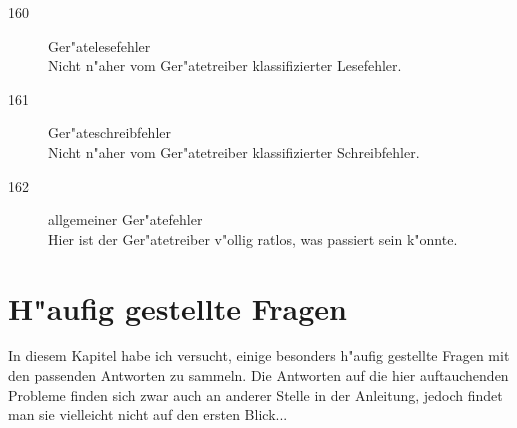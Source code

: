 \documentclass[12pt,a4paper,twoside]{report}
\begin{document}
{\begin{description}
\item[160]{Ger"atelesefehler\\
           Nicht n"aher vom Ger"atetreiber klassifizierter Lesefehler.}

\item[161]{Ger"ateschreibfehler\\
           Nicht n"aher vom Ger"atetreiber klassifizierter Schreibfehler.}

\item[162]{allgemeiner Ger"atefehler\\
           Hier ist der Ger"atetreiber v"ollig ratlos, was passiert
           sein k"onnte.}
\end{description}


\cleardoublepage
\chapter{H"aufig gestellte Fragen}

In diesem Kapitel habe ich versucht, einige besonders h"aufig gestellte
Fragen mit den passenden Antworten zu sammeln.  Die Antworten auf
die hier auftauchenden Probleme finden sich zwar auch an anderer
Stelle in der Anleitung, jedoch findet man sie vielleicht nicht auf
den ersten Blick...

}
\end{document}
